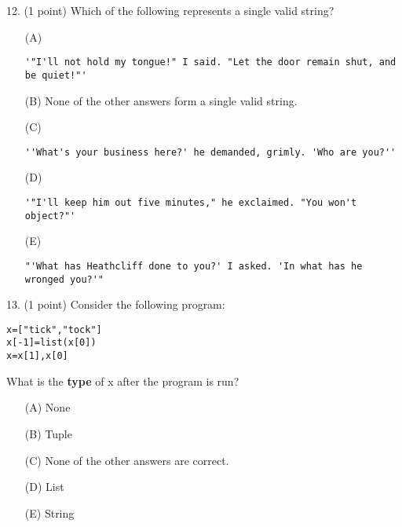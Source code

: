 \documentclass{article}
\begin{document}
\noindent
\begin{minipage}{\textwidth}
12. (1 point)
Which of the following represents a single valid string?

\begin{enumerate}
\item[(A)]
\begin{verbatim}'"I'll not hold my tongue!" I said. "Let the door remain shut, and be quiet!"'\end{verbatim}

\item[(B)]
None of the other answers form a single valid string.

\item[(C)]
\begin{verbatim}''What's your business here?' he demanded, grimly. 'Who are you?''\end{verbatim}

\item[(D)]
\begin{verbatim}'"I'll keep him out five minutes," he exclaimed. "You won't object?"'\end{verbatim}

\item[(E)]
\begin{verbatim}"'What has Heathcliff done to you?' I asked. 'In what has he wronged you?'"\end{verbatim}

\end{enumerate}
\end{minipage}
\vspace{10em}
\filbreak\vfil{}\vfilneg

\noindent
\begin{minipage}{\textwidth}
13. (1 point)
Consider the following program:
\begin{verbatim}
x=["tick","tock"]
x[-1]=list(x[0])
x=x[1],x[0]
\end{verbatim}
What is the \textbf{type} of x after the program is run?

\begin{enumerate}
\item[(A)]
None

\item[(B)]
Tuple

\item[(C)]
None of the other answers are correct.

\item[(D)]
List

\item[(E)]
String

\end{enumerate}
\end{minipage}
\vspace{10em}
\filbreak\vfil{}\vfilneg
\end{document}
